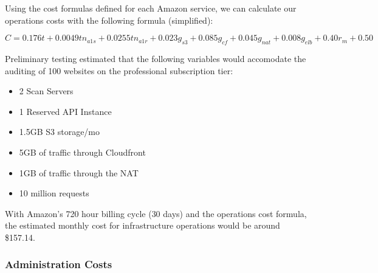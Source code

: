 \noindent
Using the cost formulas defined for each Amazon service, we can calculate our operations costs with the following formula (simplified):

\[
  C = 0.176t + 0.0049tn_{a1s} + 0.0255tn_{a1r} + 0.023g_{s3} + 0.085g_{cf} + 0.045g_{nat} + 0.008g_{elb} + 0.40r_{m} + 0.50
\]

\noindent
Preliminary testing estimated that the following variables would accomodate the auditing of 100 websites on the professional subscription tier:

\begin{itemize}

\item 2 Scan Servers
\item 1 Reserved API Instance
\item 1.5GB S3 storage/mo
\item 5GB of traffic through Cloudfront
\item 1GB of traffic through the NAT
\item 10 million requests

\end{itemize}

\noindent
With Amazon's 720 hour billing cycle (30 days) \cite{aws.calc.2020} and the operations cost formula, the estimated monthly cost for infrastructure operations would be around \$157.14.

\subsubsection{Administration Costs}

